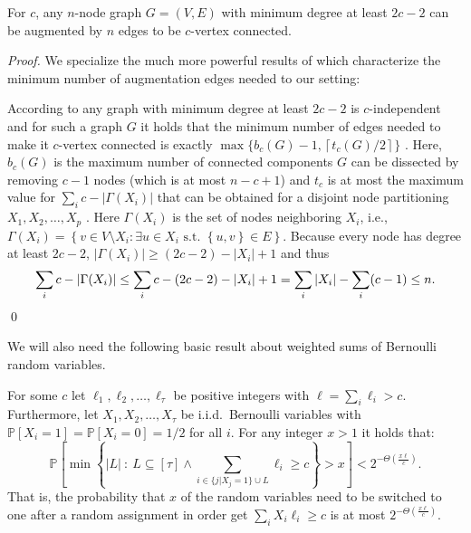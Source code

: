 \documentclass{llncs}
\newcommand{\set}[1]{\left\{#1\right\}}
\newcommand{\ceil}[1]{\left\lceil #1 \right\rceil}
\renewcommand{\Pr}{\mathbb{P}}
\begin{document}
\begin{lemma}\label{lem:kconnectmindegree}
    For $c$, any $n$-node graph $G=(V,E)$ with minimum degree at least
    $2c-2$ can be augmented by $n$ edges to be $c$-vertex connected.
\end{lemma}
 \begin{proof}
     We specialize the much more powerful results of
     \cite{jackson2005independence} which characterize the minimum
     number of augmentation edges needed to our setting:

     According to \cite[p41, criterion 4]{jackson2005independence} any
     graph with minimum degree at least $2c-2$ is $c$-independent and
     for such a graph $G$ it holds that the minimum number of edges
     needed to make it $c$-vertex connected is exactly $\max\{b_c(G)-1,
     \ceil{t_c(G)/2}\}$ \cite[Theorem
     3.12]{jackson2005independence}. Here, $b_c(G)$ is the maximum
     number of connected components $G$ can be dissected by removing
     $c-1$ nodes (which is at most $n-c+1$) and $t_c$ is at most the
     maximum value for $\sum_i c - |\Gamma(X_i)|$ that can be obtained
     for a disjoint node partitioning $X_1, X_2, \ldots, X_p$
     \cite[p33]{jackson2005independence}. Here $\Gamma(X_i)$ is the
     set of nodes neighboring $X_i$, i.e., $\Gamma(X_i)=\set{v\in
         V\setminus X_i: \exists u \in X_i \text{ s.t.\ } \set{u,v}\in
         E}$.  Because every node has degree at least $2c-2$,
    $|\Gamma(X_i)| \geq (2c-2) - |X_i| + 1$ and thus
     \[
     \sum_i c - |\Gamma(X_i)| \leq 
     \sum_i c - (2c-2) - |X_i| + 1 = \sum_i |X_i| - \sum_i (c-1) \leq
     n. \vspace{-0.5cm}
     \]
 \hspace*{\fill}\qed\end{proof}

 We will also need the following basic result about weighted sums of
 Bernoulli random variables.

\begin{lemma}\label{lem:increase}
    For some $c$ let $\ell_1, \ell_2, \ldots, \ell_\tau$ be positive integers with
    $\ell = \sum_i \ell_i > c$.  Furthermore, let $X_1, X_2, \ldots, X_\tau$
    be i.i.d.\ Bernoulli variables with $\Pr[X_i = 1] = \Pr[X_i = 0] =
    1/2$ for all $i$.  For any integer $x > 1$ it holds that:
    \[
    \Pr\left[ \min \set{|L|\ :\ L\subseteq[\tau]\land 
            \sum_{i \in \{j | X_j = 1\} \cup L} \ell_i \geq
        c} > x \right] < 2^{-\Theta(\frac{x\ell}{c})}.
    \]
    That is, the probability that $x$ of the random variables need to
    be switched to one after a random assignment in order get $\sum_i
    X_i \ell_i \geq c$ is at most $2^{-\Theta(\frac{x\ell}{c})}$.
\end{lemma}
\end{document}
